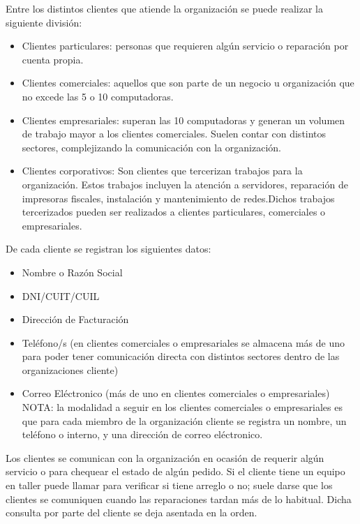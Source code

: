\documentclass[12pt]{extarticle}
\begin{document}
\begin{spacing}{1.2}
        Entre los distintos clientes que atiende la organización se puede realizar la siguiente división:
        \begin{itemize}
            \item Clientes particulares: personas que requieren algún servicio o reparación por cuenta propia.
            \item Clientes comerciales: aquellos que son parte de un negocio u organización que no excede las 5 o 10 computadoras.
            \item Clientes empresariales: superan las 10 computadoras y generan un volumen de trabajo mayor a los clientes comerciales. Suelen contar con distintos sectores, complejizando la comunicación con la organización.
            \item Clientes corporativos: Son clientes que tercerizan trabajos para la organización. Estos trabajos incluyen la atención a servidores, reparación de impresoras fiscales, instalación y mantenimiento de redes.Dichos trabajos tercerizados pueden ser realizados a clientes particulares, comerciales o empresariales.
        \end{itemize}

        De cada cliente se registran los siguientes datos:
        \begin{itemize}
            \item Nombre o Razón Social
            \item DNI/CUIT/CUIL
            \item Dirección de Facturación
            \item Teléfono/s (en clientes comerciales o empresariales se almacena más de uno para poder tener comunicación directa con distintos sectores dentro de las organizaciones cliente)
            \item Correo Eléctronico (más de uno en clientes comerciales o empresariales)\\
            NOTA: la modalidad a seguir en los clientes comerciales o empresariales es que para cada miembro de la organización cliente se registra un nombre, un teléfono o interno, y una dirección de correo eléctronico.
        \end{itemize}

        Los clientes se comunican con la organización en ocasión de requerir algún servicio o para chequear el estado de algún pedido. Si el cliente tiene un equipo en taller puede llamar para verificar si tiene arreglo o no; suele darse que los clientes se comuniquen cuando las reparaciones tardan más de lo habitual. Dicha consulta por parte del cliente se deja asentada en la orden.\\


\end{spacing}
\end{document}
